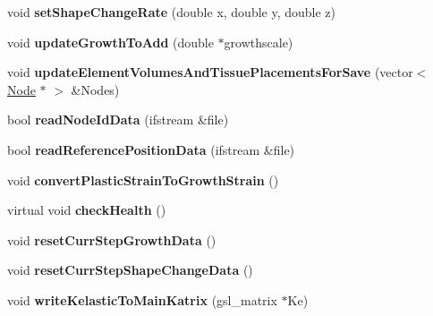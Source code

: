 \begin{DoxyCompactItemize}
\item 
\hypertarget{classShapeBase_a164d682fa7804da88cb6b16330b7f404}{}void {\bfseries set\+Shape\+Change\+Rate} (double x, double y, double z)\label{classShapeBase_a164d682fa7804da88cb6b16330b7f404}

\item 
\hypertarget{classShapeBase_acab38ef1a1f72d3df1dec8d6f45d09aa}{}void {\bfseries update\+Growth\+To\+Add} (double $\ast$growthscale)\label{classShapeBase_acab38ef1a1f72d3df1dec8d6f45d09aa}

\item 
\hypertarget{classShapeBase_a6e36c21c648f06a0e0693b3c34472fe5}{}void {\bfseries update\+Element\+Volumes\+And\+Tissue\+Placements\+For\+Save} (vector$<$ \hyperlink{classNode}{Node} $\ast$ $>$ \&Nodes)\label{classShapeBase_a6e36c21c648f06a0e0693b3c34472fe5}

\item 
\hypertarget{classShapeBase_acbd21b1daca4a94c5919147ae8c463d6}{}bool {\bfseries read\+Node\+Id\+Data} (ifstream \&file)\label{classShapeBase_acbd21b1daca4a94c5919147ae8c463d6}

\item 
\hypertarget{classShapeBase_a37a16216b042486dfdcbb16d8366eb7f}{}bool {\bfseries read\+Reference\+Position\+Data} (ifstream \&file)\label{classShapeBase_a37a16216b042486dfdcbb16d8366eb7f}

\item 
\hypertarget{classShapeBase_a78d45ea18373ce5e21b7567e9e6bdabc}{}void {\bfseries convert\+Plastic\+Strain\+To\+Growth\+Strain} ()\label{classShapeBase_a78d45ea18373ce5e21b7567e9e6bdabc}

\item 
\hypertarget{classShapeBase_adb6927dd05e3f6aa1c5ac5d32a30b5da}{}virtual void {\bfseries check\+Health} ()\label{classShapeBase_adb6927dd05e3f6aa1c5ac5d32a30b5da}

\item 
\hypertarget{classShapeBase_a35a4fb8458adc80435e11da10cb6627b}{}void {\bfseries reset\+Curr\+Step\+Growth\+Data} ()\label{classShapeBase_a35a4fb8458adc80435e11da10cb6627b}

\item 
\hypertarget{classShapeBase_a3c08833714950163efbf15f9b1c26765}{}void {\bfseries reset\+Curr\+Step\+Shape\+Change\+Data} ()\label{classShapeBase_a3c08833714950163efbf15f9b1c26765}

\item 
\hypertarget{classShapeBase_af6cd6e943b529eca33c92723893bf991}{}void {\bfseries write\+Kelastic\+To\+Main\+Katrix} (gsl\+\_\+matrix $\ast$Ke)\label{classShapeBase_af6cd6e943b529eca33c92723893bf991}


\end{DoxyCompactItemize}
